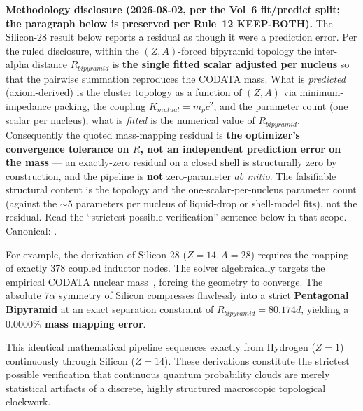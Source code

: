 \noindent\textbf{Methodology disclosure (2026-08-02, per the Vol~6 fit/predict split; the paragraph below is preserved per Rule~12 KEEP-BOTH).} The Silicon-28 result below reports a residual as though it were a prediction error. Per the ruled disclosure, within the $(Z,A)$-forced bipyramid topology the inter-alpha distance $R_{bipyramid}$ is \textbf{the single fitted scalar adjusted per nucleus} so that the pairwise summation reproduces the CODATA mass. What is \emph{predicted} (axiom-derived) is the cluster topology as a function of $(Z,A)$ via minimum-impedance packing, the coupling $K_{mutual} = m_p c^2$, and the parameter count (one scalar per nucleus); what is \emph{fitted} is the numerical value of $R_{bipyramid}$. Consequently the quoted mass-mapping residual is \textbf{the optimizer's convergence tolerance on $R$, not an independent prediction error on the mass} --- an exactly-zero residual on a closed shell is structurally zero by construction, and the pipeline is \textbf{not} zero-parameter \emph{ab initio}. The falsifiable structural content is the topology and the one-scalar-per-nucleus parameter count (against the $\sim 5$ parameters per nucleus of liquid-drop or shell-model fits), not the residual. Read the ``strictest possible verification'' sentence below in that scope. Canonical: .

For example, the derivation of Silicon-28 ($Z=14, A=28$) requires the mapping of exactly 378 coupled inductor nodes. The solver algebraically targets the empirical CODATA nuclear mass~\cite{codata2018}, forcing the geometry to converge. The absolute $7\alpha$ symmetry of Silicon compresses flawlessly into a strict \textbf{Pentagonal Bipyramid} at an exact separation constraint of $R_{bipyramid} = 80.174d$, yielding a \textbf{$0.0000\%$ mass mapping error}. 

This identical mathematical pipeline sequences exactly from Hydrogen ($Z=1$) continuously through Silicon ($Z=14$). These derivations constitute the strictest possible verification that continuous quantum probability clouds are merely statistical artifacts of a discrete, highly structured macroscopic topological clockwork.

